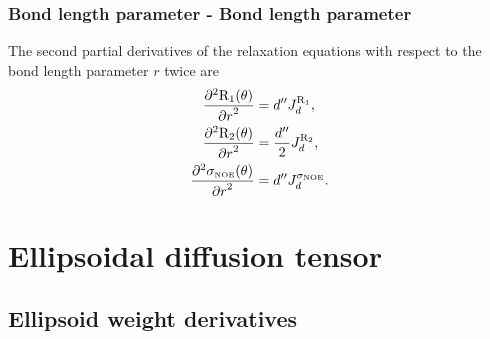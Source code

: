 \subsubsection{Bond length parameter - Bond length parameter}

The second partial derivatives of the relaxation equations with respect to the bond length parameter $r$ twice are
\begin{align}
    \frac{\partial^2 \mathrm{R}_1(\theta)}{{\partial r}^2} &= d'' J_d^{\mathrm{R}_1},                 \label{eq: Ri': d2R1/dr2} \\
    \frac{\partial^2 \mathrm{R}_2(\theta)}{{\partial r}^2} &= \frac{d''}{2} J_d^{\mathrm{R}_2},       \label{eq: Ri': d2R2/dr2} \\
    \frac{\partial^2 \sigma_{\scriptscriptstyle \mathrm{NOE}}(\theta)}{{\partial r}^2} &= d'' J_d^{\sigma_{\scriptscriptstyle \mathrm{NOE}}}.   \label{eq: Ri': d2sigmaNOE/dr2}
\end{align}




\section{Ellipsoidal diffusion tensor}




\subsection{Ellipsoid weight derivatives}



